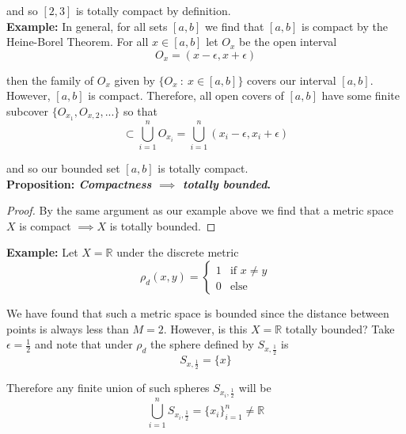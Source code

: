 \documentclass[12pt]{article}
\newlength\tindent
\renewcommand{\indent}{\hspace*{\tindent}}
\newcommand{\R}{\mathbb R}
\begin{document}
and so $[2,3]$ is totally compact by definition. \\

%
%
{\bf Example:} In general, for all sets $[a,b]$ we find that $[a,b]$ is compact by the Heine-Borel Theorem. For all $x \in [a,b]$ let $O_x$ be the open interval
\begin{equation*}
	O_x = (x - \epsilon, x + \epsilon)
\end{equation*}

then the family of $O_x$ given by $\{O_x ~:~ x \in [a,b]\}$ covers our interval $[a,b]$. However, $[a,b]$ is compact. Therefore, all open covers of $[a,b]$ have some finite subcover $\{O_{x_1}, O_{x,2}, ...\}$ so that
\begin{equation*}
	[a,b] \subset \bigcup^n_{i = 1} O_{x_i} = \bigcup^n_{i = 1} (x_i - \epsilon, x_i + \epsilon)
\end{equation*}

and so our bounded set $[a,b]$ is totally compact. \\

%
%
{\bf Proposition: {\em Compactness $\implies$ totally bounded}.}
\begin{proof} By the same argument as our example above we find that a metric space $X$ is compact $\implies X$ is totally bounded.
\end{proof} 

%
%
{\bf Example:} Let $X = \R$ under the discrete metric
\begin{equation*}
	\rho_d(x,y) =
	\begin{cases}
		1 & \text{if $x \neq y$} \\
		0 & \text{else}
	\end{cases}
\end{equation*}

\indent We have found that such a metric space is bounded since the distance between points is always less than $M = 2$. However, is this $X = \R$ totally bounded? Take $\epsilon = \frac{1}{2}$ and note that under $\rho_d$ the sphere defined by $S_{x,\frac{1}{2}}$ is
\begin{equation*}
	S_{x,\frac{1}{2}} = \{x\}
\end{equation*}

Therefore any finite union of such spheres $S_{x_i,\frac{1}{2}}$ will be
\begin{equation*}
	\bigcup^n_{i = 1} S_{x_i,\frac{1}{2}} = \{x_i\}^n_{i = 1} \neq \R
\end{equation*}
\end{document}
